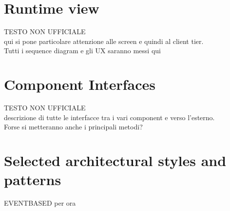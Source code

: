 \documentclass[\mainpath/main]{subfiles}
\begin{document}
\section{Runtime view}
\label{ArchitecturalDesign:runtime}

TESTO NON UFFICIALE\\
qui si pone particolare attenzione alle screen e quindi al client tier.\\
Tutti i sequence diagram e gli UX saranno messi qui\\

\section{Component Interfaces}
\label{ArchitecturalDesign:comp_interfaces}

TESTO NON UFFICIALE\\
descrizione di tutte le interfacce tra i vari component e verso l'esterno.\\
Forse si metteranno anche i principali metodi?\\


\section{Selected architectural styles and patterns}
\label{ArchitecturalDesign:design_patterns}


EVENTBASED per ora\\


\end{document}
